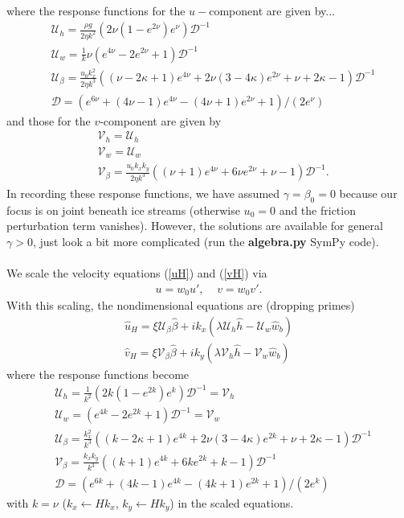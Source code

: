 \documentclass[paper=a4, fontsize=11pt]{article}
\begin{document}
where the response functions for the $u-$component are given by...
\begin{align}
& \mathcal{U}_h   =  \frac{\rho g}{2\eta k^2} \left(2\nu (1-e^{2\nu}) e^{\nu} \right)\mathcal{D}^{-1}  \\
& \mathcal{U}_w  = \frac{1}{k}\nu\left( e^{4\nu} - 2e^{2\nu}+1 \right)\mathcal{D}^{-1} \\
& \mathcal{U}_\beta  = \frac{u_0 k_x^2}{2\eta k^3}\left((\nu-2\kappa+1)e^{4\nu} +2\nu(3-4\kappa)e^{2\nu} + \nu+2\kappa-1\right)\mathcal{D}^{-1}  \\
& \mathcal{D}  =  (e^{6\nu} + (4\nu-1)e^{4\nu}- (4\nu+1)e^{2\nu}+1)/(2e^{\nu})
\end{align}
and those for the $v$-component are given by
\begin{align}
  & \mathcal{V}_h = \mathcal{U}_h\\
  & \mathcal{V}_w = \mathcal{U}_w\\
  & \mathcal{V}_\beta  =  \frac{u_0 k_x k_y}{2\eta k^3}\left((\nu+1)e^{4\nu} +6\nu e^{2\nu} + \nu-1\right)\mathcal{D}^{-1} .
\end{align}
In recording these response functions, we have assumed $\gamma=\beta_0=0$
because our focus is on joint beneath ice streams (otherwise $u_0=0$
and the friction perturbation term vanishes). However, the solutions are available
for general $\gamma>0$, just look a bit more complicated (run the \textbf{algebra.py} SymPy code). \\ \\
We scale the velocity equations (\ref{uH}) and (\ref{vH}) via
\begin{align}
u = w_0 u', \;\;\;\; v = w_0v'.
\end{align}
With this scaling, the nondimensional equations are (dropping primes)
\begin{align}
\widehat{u}_H =    \xi\mathcal{U}_{\beta} \widehat{\beta} +ik_x\left(\lambda\mathcal{U}_h\widehat{h} -  \mathcal{U}_w\widehat{w}_b\right) \label{uHsc}\\
\widehat{v}_H =  \xi\mathcal{V}_{\beta} \widehat{\beta}+ik_y\left(\lambda\mathcal{V}_h\widehat{h} -  \mathcal{V}_w\widehat{w}_b\right)\label{vHsc}
\end{align}
where the response functions become
\begin{align}
&\mathcal{U}_h =   \frac{1}{k^2}  \left(2k (1-e^{2k}) e^{k} \right)\mathcal{D}^{-1}   = \mathcal{V}_h \\
&\mathcal{U}_w =  \left( e^{4k} - 2e^{2k}+1 \right)\mathcal{D}^{-1}  = \mathcal{V}_w \\
&\mathcal{U}_\beta =   \frac{k_x^2}{k^3} \left((k-2\kappa+1)e^{4k} +2\nu(3-4\kappa)e^{2k} + \nu+2\kappa-1\right)\mathcal{D}^{-1}   \\
&\mathcal{V}_\beta =  \frac{k_x k_y}{k^3} \left((k+1)e^{4k} +6k e^{2k} + k-1\right)\mathcal{D}^{-1}\\
& \mathcal{D}  =  (e^{6k} + (4k-1)e^{4k}- (4k+1)e^{2k}+1)/(2e^{k})
\end{align}
with $k=\nu$ ($k_x \gets Hk_x$, $k_y \gets Hk_y$) in the scaled equations.
\end{document}
